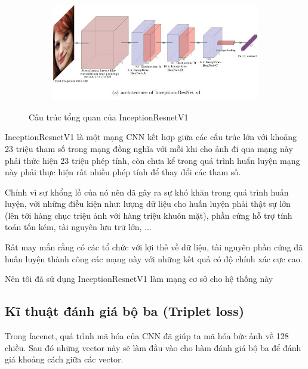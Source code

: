 \begin{figure}
    \begin{subfigure}{1.\textwidth}
        \begin{center}
            \includegraphics[width=1.\linewidth]{Chapters/items/chap2_19.jpg}
        \end{center}
        \label{fig:chap2_19}
    \end{subfigure}
    \caption{Cấu trúc tổng quan của InceptionResnetV1}
\end{figure}

InceptionResnetV1 là một mạng CNN kết hợp giữa các cấu trúc lớn với khoảng 23 triệu tham số trong mạng đồng nghĩa với
mỗi khi cho ảnh đi qua mạng này phải thức hiện 23 triệu phép tính, còn chưa kể trong quá trình huẩn luyện
mạng này phải thực hiện rất nhiều phép tính để thay đổi các tham số.

Chính vì sự khổng lồ của nó nên đã gây ra sự khó khăn trong quá trình huấn luyện, với những điều kiện như:
lượng dữ liệu cho huấn luyện phải thật sự lớn (lên tới hàng chục triệu ảnh với hàng triệu khuôn mặt),
phần cứng hỗ trợ tính toán tốn kém, tài nguyên lưu trữ lớn, ...

Rất may mắn rằng có các tổ chức với lợi thế về dữ liệu, tài nguyên phần cứng đã huấn luyện thành công
các mạng này với những kết quả có độ chính xác cực cao.

Nên tôi đã sử dụng InceptionResnetV1 làm mạng cơ sở cho hệ thống này

\newpage
\subsection{Kĩ thuật đánh giá bộ ba (Triplet loss)}
Trong facenet, quá trình mã hóa của CNN đã giúp ta mã hóa bức ảnh về 128 chiều.
Sau đó những vector này sẽ làm đầu vào cho hàm đánh giá bộ ba để đánh giá khoảng
cách giữa các vector.


